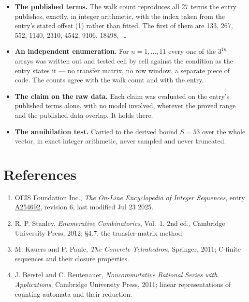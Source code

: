 \documentclass[11pt]{article}
\theoremstyle{definition}
\begin{document}
\begin{itemize}

\item {\bfseries The published terms.} The walk count reproduces all 27 terms the entry publishes, exactly, in integer arithmetic, with the index taken from the entry's stated offset (1) rather than fitted. The first of them are 133, 267, 552, 1140, 2310, 4542, 9106, 18498,~\dots

\item {\bfseries An independent enumeration.} For $n = 1,\dots,11$ every one of the $3^{1n}$ arrays was written out and tested cell by cell against the condition as the entry states it --- no transfer matrix, no row window, a separate piece of code. The counts agree with the walk count and with the entry.

\item {\bfseries The claim on the raw data.} Each claim was evaluated on the entry's published terms alone, with no model involved, wherever the proved range and the published data overlap. It holds there.

\item {\bfseries The annihilation test.} Carried to the derived bound $S = 53$ over the whole vector, in exact integer arithmetic, never sampled and never truncated.

\end{itemize}

\section{References}

\begin{enumerate}

\item OEIS Foundation Inc., \emph{The On-Line Encyclopedia of Integer Sequences}, entry \href{https://oeis.org/A254692}{A254692}, revision 6, last modified Jul 23 2025.

\item R. P. Stanley, \emph{Enumerative Combinatorics}, Vol.~1, 2nd ed., Cambridge University Press, 2012; \S4.7, the transfer-matrix method.

\item M. Kauers and P. Paule, \emph{The Concrete Tetrahedron}, Springer, 2011; C-finite sequences and their closure properties.

\item J. Berstel and C. Reutenauer, \emph{Noncommutative Rational Series with Applications}, Cambridge University Press, 2011; linear representations of counting automata and their reduction.

\end{enumerate}
\end{document}

